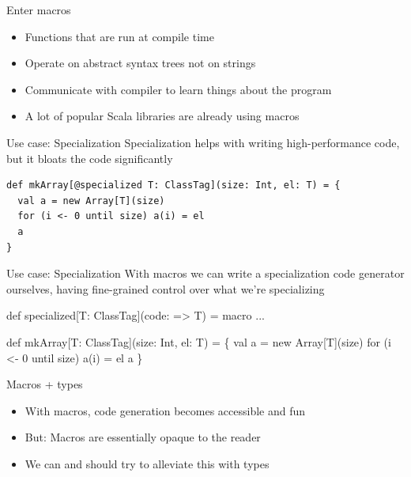 \documentclass{beamer}
\begin{document}

\begin{frame}{Enter macros}
  \begin{itemize}
    \item Functions that are run at compile time
    \item Operate on abstract syntax trees not on strings
    \item Communicate with compiler to learn things about the program
    \item A lot of popular Scala libraries are already using macros
  \end{itemize}
\end{frame}

\begin{frame}[fragile]{Use case: Specialization}
  Specialization helps with writing high-performance code,
  but it bloats the code significantly

  \vspace{1em}
  \begin{verbatim}
def mkArray[@specialized T: ClassTag](size: Int, el: T) = {
  val a = new Array[T](size)
  for (i <- 0 until size) a(i) = el
  a
}
  \end{verbatim}
\end{frame}

\begin{frame}[fragile]{Use case: Specialization}
  With macros we can write a specialization code generator ourselves,
  having fine-grained control over what we're specializing

  \vspace{1em}
  \begin{semiverbatim}
def specialized[T: ClassTag](code: => T) = macro ...

def mkArray[T: ClassTag](size: Int, el: T) = \{
  val a = new Array[T](size)
    for (i <- 0 until size) a(i) = el
  \text{\color{blue}{\}}}
  a
\}
  \end{semiverbatim}
\end{frame}

\begin{frame}{Macros + types}
  \begin{itemize}
    \item With macros, code generation becomes accessible and fun
    \item But: Macros are essentially opaque to the reader
    \item We can and should try to alleviate this with types
  \end{itemize}
\end{frame}
\end{document}
